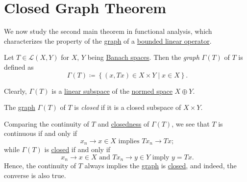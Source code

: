 \section{Closed Graph Theorem}
We now study the second main theorem in functional analysis, which characterizes the property of the \hyperref[def:graph]{graph} of a \hyperref[def:bounded-linear-op]{bounded linear operator}.
\begin{definition}[Graph]\label{def:graph}
	Let \(T\in \mathcal{L} (X, Y)\) for \(X\), \(Y\) being \hyperref[def:Banach-space]{Banach spaces}. Then the \emph{graph} \(\Gamma (T)\) of \(T\) is defined as
	\[
		\Gamma (T) \coloneqq \left\{ (x, Tx) \in X \times Y\mid x\in X \right\}.
	\]
\end{definition}

Clearly, \(\Gamma (T)\) is a \hyperref[def:linear-vector-space]{linear subspace} of the \hyperref[def:normed-vector-space]{normed space} \(X\oplus Y\).

\begin{definition}\label{def:closed-graph}
	The \hyperref[def:graph]{graph} \(\Gamma (T)\) of \(T\) is \emph{closed} if it is a closed subspace of \(X \times Y\).
\end{definition}

Comparing the continuity of \(T\) and \hyperref[def:closed-graph]{closedness} of \(\Gamma (T)\), we see that \(T\) is continuous if and only if
\[
	x_n \to x\in X \text{ implies } Tx_n \to Tx;
\]
while \(\Gamma (T)\) is \hyperref[def:closed-graph]{closed} if and only if
\[
	x_n \to x\in X \text{ and } Tx_n \to y\in Y \text{ imply } y = Tx.
\]
Hence, the continuity of \(T\) always implies the \hyperref[def:graph]{graph} is \hyperref[def:closed-graph]{closed}, and indeed, the converse is also true.

